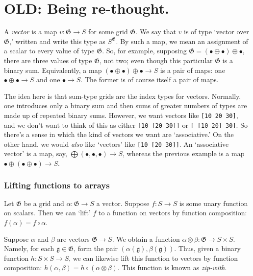 \documentclass[11pt]{article}
\newcommand{\gr}[1]{\mathfrak{#1}}
\newcommand{\GG}{\gr{G}}
\newcommand{\unit}{\bullet}
\begin{document}
\section{OLD: Being re-thought.}
\label{sec:org0f361a3}


A \emph{vector} is a map \(v : \GG\to S\) for some grid \(\GG\). We say that \(v\) is of
type ‘vector over \(\GG\),’ written and write this type as \(S^\GG\). By such a map,
we mean an assignment of a scalar to every value of type \(\GG\). So, for example,
supposing \(\GG = (\unit\oplus\unit) \oplus \unit\), there are three values of
type \(\GG\), not two; even though this particular \(\GG\) is a binary
sum. Equivalently, a map \((\unit\oplus\unit) \oplus \unit\to S\) is a pair of
maps: one \(\unit\oplus\unit\to S\) and one \(\unit\to S\). The former is of course
itself a pair of maps.

The idea here is that sum-type grids are the index types for vectors. Normally,
one introduces only a binary sum and then sums of greater numbers of types are
made up of repeated binary sums. However, we want vectors like \texttt{[10 20 30]}, and
we don't want to think of this as either \texttt{[10 [20 30]]} or \texttt{[ [10 20] 30]}.  So
there's a sense in which the kind of vectors we want are ‘associative.’ On the
other hand, we would \emph{also} like ‘vectors’ like \texttt{[10 [20 30]]}. An ‘associative
vector’ is a map, say, \(\bigoplus(\unit, \unit, \unit)\to S\), whereas the
previous example is a map \(\unit\oplus (\unit\oplus \unit)\to S\).

\subsubsection{Lifting functions to arrays}
\label{sec:orgc0391ab}

Let \(\GG\) be a grid and \(\alpha:\GG\to S\) a vector. Suppose \(f:S\to S\) is some
unary function on scalars. Then we can ‘lift’ \(f\) to a function on vectors by
function composition: \(f(\alpha) = f\circ\alpha\).

Suppose \(\alpha\) and \(\beta\) are vectors \(\GG\to S\). We obtain a function
\(\alpha\otimes\beta : \GG\to S\times S\). Namely, for each \(\mathfrak{g}\in \GG\),
form the pair \((\alpha(\mathfrak{g}), \beta(\mathfrak{g}))\). Thus, given a
binary function \(h : S\times S\to S\), we can likewise lift this function to
vectors by function composition: \(h(\alpha, \beta) = h\circ
(\alpha\otimes\beta)\). This function is known as \emph{zip-with}.
\end{document}
